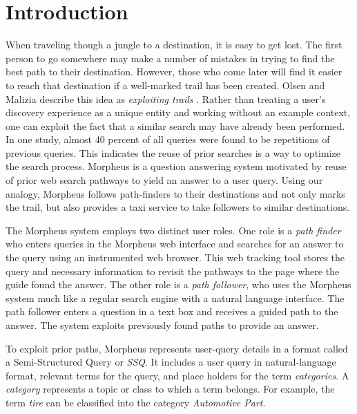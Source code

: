 \section{Introduction}



When traveling though a jungle to a destination, it is easy to get
lost.  The first person to go somewhere may make a number of mistakes
in trying to find the best path to their destination.  However, those
who come later will find it easier to reach that destination if a
well-marked trail has been created. Olsen and Malizia describe this
idea as \emph{exploiting trails} \cite{5379671}.  Rather than treating
a user's discovery experience as a unique entity and working without an example
context, one can exploit the fact that a similar search may have already been
performed.  In one study, almost 40 percent of all queries
were found to be repetitions of previous queries\cite{1277770}. This
indicates the reuse of prior searches is a way to optimize the search
process.  Morpheus is a question answering system motivated by reuse of prior
web search pathways to yield an answer to a user query. Using our analogy,
Morpheus follows path-finders to their destinations and not only marks the
trail, but also provides a taxi service to take followers to similar
destinations.


The Morpheus system employs two distinct user roles. One role is a
\textit{path finder} who enters queries in the Morpheus web interface and
searches for an answer to the query using an instrumented web browser. 
This web tracking tool stores the query
and necessary information to revisit the pathways to the page where the guide 
found the answer. The other role is a \textit{path follower}, who uses the Morpheus system much like a regular search engine with a natural language interface. The path follower enters a question in a text box and receives a guided path to the answer. The system exploits previously found paths to provide an answer.

To exploit prior paths, Morpheus represents user-query details in a format called a Semi-Structured Query or \textit{SSQ}. It includes a user query in natural-language format, relevant terms for the query, and place holders for the term \textit{categories}. A \textit{category} represents a
topic or class to which a term belongs. For example, the term \textit{tire} can be classified into the category \textit{Automotive Part}.

